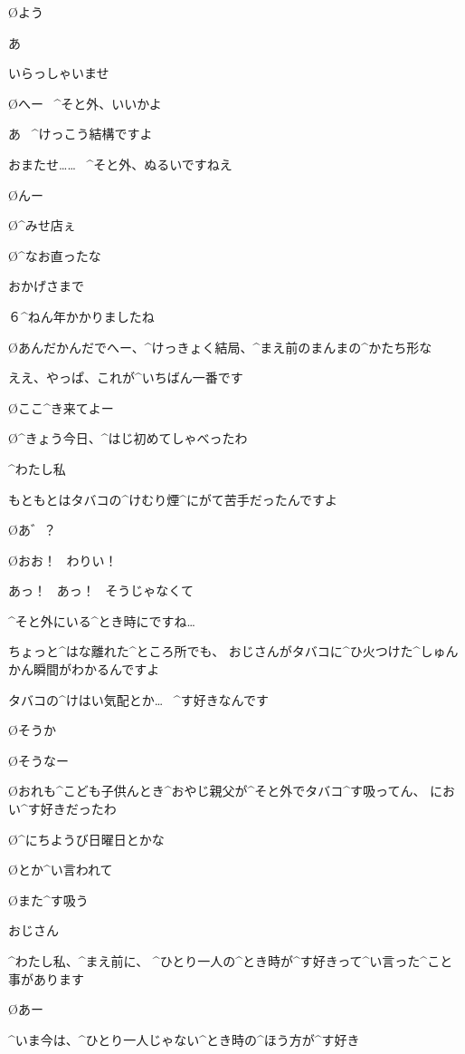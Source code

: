 \page[148]
\O よう

\A あ

\A いらっしゃいませ

\page
\O へー
\ ^{そと}{外}、いいかよ

\A あ
\ ^{けっこう}{結構}ですよ

\page
\A おまたせ……
\ ^{そと}{外}、ぬるいですねえ

\O んー

\page
\O ^{みせ}{店}ぇ

\O ^{なお}{直}ったな

\A おかげさまで

\A ６^{ねん}{年}かかりましたね

\O あんだかんだでへー、^{けっきょく}{結局}、^{まえ}{前}のまんまの^{かたち}{形}な

\A ええ、やっぱ、これが^{いちばん}{一番}です

\page
\O ここ^{き}{来}てよー

\O ^{きょう}{今日}、^{はじ}{初}めてしゃべったわ

\page
\A ^{わたし}{私}

\A もともとはタバコの^{けむり}{煙}^{にがて}{苦手}だったんですよ

\O あ゛？

\O おお！
\ わりい！

\A あっ！
\ あっ！
\ そうじゃなくて

\A ^{そと}{外}にいる^{とき}{時}にですね…

\A ちょっと^{はな}{離}れた^{ところ}{所}でも、
おじさんがタバコに^{ひ}{火}つけた^{しゅんかん}{瞬間}がわかるんですよ

\A タバコの^{けはい}{気配}とか…
\ ^{す}{好}きなんです

\page
\O そうか

\O そうなー

\O おれも^{こども}{子供}んとき^{おやじ}{親父}が^{そと}{外}でタバコ^{す}{吸}ってん、
におい^{す}{好}きだったわ

\O ^{にちようび}{日曜日}とかな

\page
\O とか^{い}{言}われて

\O また^{す}{吸}う

\A おじさん

\A ^{わたし}{私}、^{まえ}{前}に、
^{ひとり}{一人}の^{とき}{時}が^{す}{好}きって^{い}{言}った^{こと}{事}があります

\O あー

\A ^{いま}{今}は、^{ひとり}{一人}じゃない^{とき}{時}の^{ほう}{方}が^{す}{好}き

